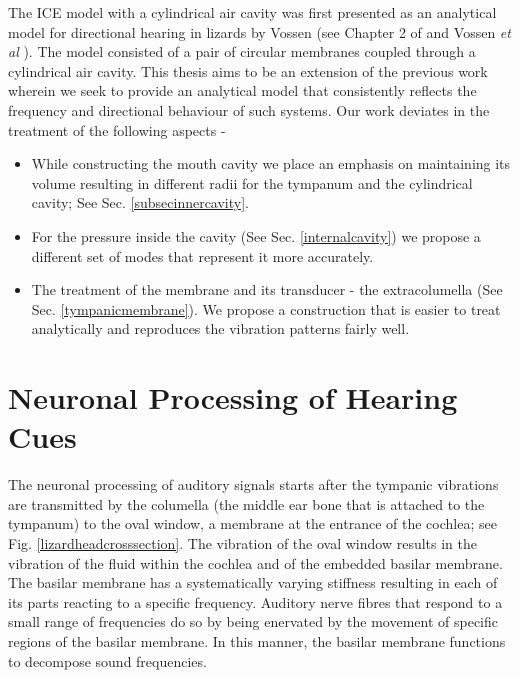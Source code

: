 \documentclass[12pt]{book}
\begin{document}
 The ICE model with a cylindrical air cavity was first presented as an analytical model for
directional hearing in lizards  by Vossen (see Chapter 2 of \cite{vossenthesis} and Vossen \emph{et al} \cite{vossenjasa}).
The model consisted of a pair of circular membranes coupled through a cylindrical air cavity. This thesis aims to be an extension of the previous work
wherein we seek to provide an analytical model that consistently reflects the frequency and directional behaviour of such systems. Our work deviates in
the treatment of the following aspects - 
\begin{itemize}
 \item While constructing the mouth cavity we place an emphasis on maintaining its volume resulting in different radii for the tympanum and the cylindrical cavity; See Sec. \ref{subsecinnercavity}.
 \item For the pressure inside the cavity (See Sec. \ref{internalcavity}) we propose a different set of modes that represent it more accurately.
 \item The treatment of the membrane and its transducer - the extracolumella (See Sec. \ref{tympanicmembrane}). We propose a construction that is easier to treat analytically and reproduces
 the vibration patterns fairly well.
 \end{itemize}

\section{Neuronal Processing of Hearing Cues}\label{iceneuro}
The neuronal processing of auditory signals starts after the tympanic vibrations are transmitted by the columella (the middle ear bone that is attached to the tympanum)
to the oval window, a membrane at the entrance of the cochlea; see Fig. \ref{lizardheadcrosssection}. The vibration of the oval window results in the vibration of
the fluid within the cochlea and of the embedded basilar membrane. The basilar membrane has a systematically varying stiffness resulting in each of its parts 
reacting to a specific frequency. Auditory nerve fibres that respond to a small range of frequencies do so by being enervated by the movement of specific
regions of the basilar membrane. In this manner, the basilar membrane functions to decompose sound frequencies.
\end{document}
